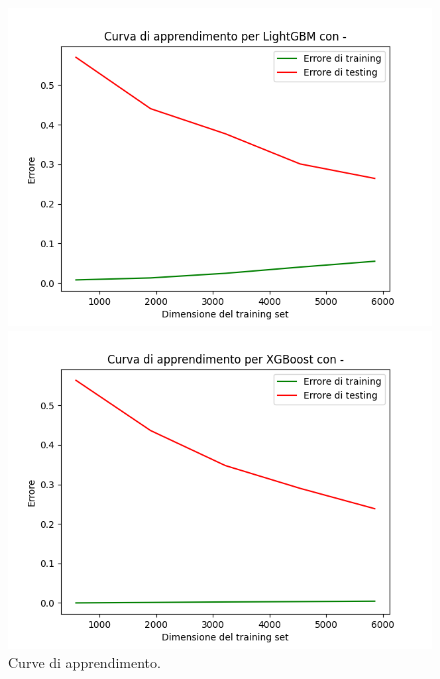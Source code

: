 \begin{figure}[H]
\begin{minipage}[b]{0.45\linewidth}
    \end{minipage}
    
    \begin{minipage}[b]{0.45\linewidth}
      \centering
      \includegraphics[scale=0.5]{img/learning_curve_LightGBM_-.png}
      
    \end{minipage}
    \hfill
    \begin{minipage}[b]{0.45\linewidth}
      \centering
      \includegraphics[scale=0.5]{img/learning_curve_XGBoost_-.png}
      
    \end{minipage}
    \caption{Curve di apprendimento.}
    
    \end{figure}

